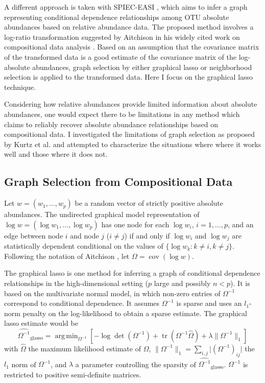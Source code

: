 \documentclass[12pt]{article}
\newcommand{\cov}{\operatorname{cov}}
\DeclareMathOperator*{\argmin}{arg\,min}
\DeclareMathOperator{\tr}{tr}
\begin{document}
A different approach is taken with SPIEC-EASI \cite{kurtz}, which aims to infer a graph representing conditional dependence relationships among OTU absolute abundances based on relative abundance data. The proposed method involves a log-ratio transformation suggested by Aitchison in his widely cited work on compositional data analysis \citeyear{aitchison}. Based on an assumption that the covariance matrix of the transformed data is a good estimate of the covariance matrix of the log-absolute abundances, graph selection by either graphical lasso or neighborhood selection is applied to the transformed data. Here I focus on the graphical lasso technique.

Considering how relative abundances provide limited information about absolute abundances, one would expect there to be limitations in any method which claims to reliably recover absolute abundance relationships based on compositional data. I investigated the limitations of graph selection as proposed by Kurtz et al. \citeyear{kurtz} and attempted to characterize the situations where where it works well and those where it does not.

\subsection*{Graph Selection from Compositional Data}

Let $w = (w_1, \dots, w_p)$ be a random vector of strictly positive absolute abundances. The undirected graphical model representation of $\log w = (\log w_1, \dots, \log w_p)$ has one node for each $\log w_i$, $i = 1, \dots, p$, and an edge between node $i$ and node $j$ ($i \ne j$) if and only if $\log w_i$ and $\log w_j$ are statistically dependent conditional on the values of $\{\log w_k : k \ne i, k \ne j\}$. Following the notation of Aitchison \citeyear{aitchison}, let $\Omega = \cov(\log w)$.

The graphical lasso \cite{friedmanjer} is one method for inferring a graph of conditional dependence relationships in the high-dimensional setting ($p$ large and possibly $n < p$). It is based on the multivariate normal model, in which non-zero entries of $\Omega^{-1}$ correspond to conditional dependence. It assumes $\Omega^{-1}$ is sparse and uses an $l_1$-norm penalty on the log-likelihood to obtain a sparse estimate. The graphical lasso estimate would be
\begin{equation}
\label{e:glasso}
\widehat{\Omega^{-1}}_{\text{glasso}} = \argmin_{\Omega^{-1}} \left[ -\log \det(\Omega^{-1}) + \tr(\Omega^{-1} \hat{\Omega}) + \lambda \lVert \Omega^{-1} \rVert_1 \right]
\end{equation}
with $\hat{\Omega}$ the maximum likelihood estimate of $\Omega$, $\lVert \Omega^{-1} \rVert_1 = \sum_{i,j} \lvert (\Omega^{-1})_{ij} \rvert$ the $l_1$ norm of $\Omega^{-1}$, and $\lambda$ a parameter controlling the sparsity of $\widehat{\Omega^{-1}}_{\text{glasso}}$. $\Omega^{-1}$ is restricted to positive semi-definite matrices.
\end{document}
